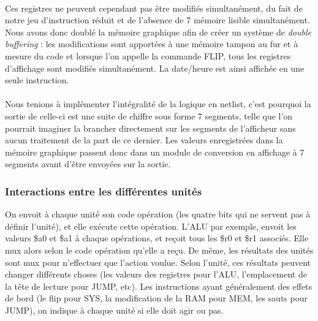 \documentclass{article}
\begin{document}
\paragraph{}
Ces registres ne peuvent cependant pas être modifiés simultanément, du fait de
notre jeu d'instruction réduit et de l'absence de 7 mémoire lisible simultanément.
Nous avons donc doublé la mémoire graphique afin de créer un système de \emph{double
buffering} : les modifications sont apportées à une mémoire tampon au fur et à mesure
du code et lorsque l'on appelle la commande FLIP, tous les registres d'affichage
sont modifiés simultanément. La date/heure est ainsi affichée en une seule instruction.

\paragraph{}
Nous tenions à implémenter l'intégralité de la logique en netlist, c'est pourquoi
la sortie de celle-ci est une suite de chiffre sous forme 7 segments, telle que l'on
pourrait imaginer la brancher directement sur les segments de l'afficheur sans
aucun traitement de la part de ce dernier. Les valeurs enregistrées dans la mémoire
graphique passent donc dans un module de conversion en affichage à 7 segments avant
d'être envoyées sur la sortie.


\subsubsection{Interactions entre les différentes unités}

On envoit à chaque unité son code opération (les quatre bits qui ne servent pas
à définir l'unité), et elle exécute cette opération. L'ALU par exemple, envoit
les valeurs \$a0 et \$a1 à chaque opérations, et reçoit tous les \$r0 et \$r1
associés. Elle mux alors selon le code opération qu'elle a reçu. De même, les
résultats des unités sont mux pour n'effectuer que l'action voulue. Selon
l'unité, ces résultats peuvent changer différents choses (les valeurs des
registres pour l'ALU, l'emplacement de la tête de lecture pour JUMP, etc).
Les instructions ayant généralement des effets de bord (le flip pour SYS,
la modification de la RAM pour MEM, les sauts pour JUMP), on indique à chaque
unité si elle doit agir ou pas.\\
\end{document}
